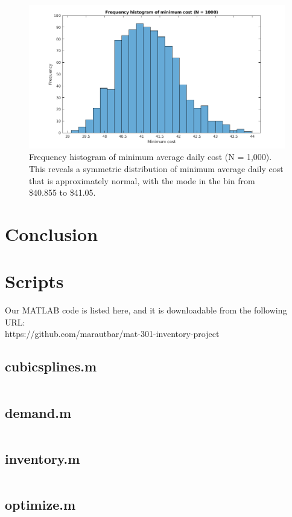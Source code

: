 \documentclass{article}
\begin{document}
    \begin{figure}[h]
        \centering
        \includegraphics[width=\textwidth]{img/histogram.png}
        \caption{Frequency histogram of minimum average daily cost (N = 1,000). This reveals a symmetric distribution of minimum average daily cost that is approximately normal, with the mode in the bin from \$40.855 to \$41.05.}
        \label{fig:histogram}
    \end{figure}
    \pagebreak
    \section*{Conclusion}
    \pagebreak
    \section*{Scripts}
    Our MATLAB code is listed here, and it is downloadable from the following URL:\\
    https://github.com/marautbar/mat-301-inventory-project
    \subsection*{cubicsplines.m}
    \inputminted[linenos,breaklines]{matlab}{matlab/cubicsplines.m}
    \subsection*{demand.m}
    \inputminted[linenos,breaklines]{matlab}{matlab/demand.m}
    \subsection*{inventory.m}
    \inputminted[linenos,breaklines]{matlab}{matlab/inventory.m}
    \subsection*{optimize.m}
    \inputminted[linenos,breaklines]{matlab}{matlab/optimize.m}
\end{document}
